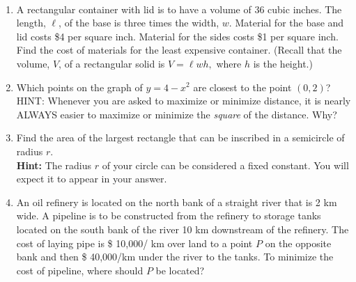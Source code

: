 \documentclass[11pt,fleqn]{article}
\begin{document}
\vspace*{-0.7in}

\begin{center}
  \Large{}\\
\end{center}
\begin{enumerate}
\item A rectangular container with lid is to have a volume of 36 cubic inches. The length, $\ell$, of the base is three times the width, $w.$ Material for the base and lid costs \$4 per square inch. Material for the sides costs \$1 per square inch. Find the cost of materials for the least expensive container. (Recall that the volume, $V$, of a rectangular solid is $V=\ell w h,$ where $h$ is the height.)
\vfill
\item Which points on the graph of $y = 4-x^2$ are
  closest to the point $(0, 2)$?\\
   HINT: Whenever you are asked to maximize or minimize distance, it is nearly ALWAYS easier to maximize or minimize the \emph{square} of the distance. Why?
\vfill
\newpage
\item Find the area of the largest rectangle that can
  be inscribed in a semicircle of radius $r$.\\ \textbf{Hint:} The radius $r$ of your circle can be considered a fixed constant. You will expect it to appear in your answer. 
  \vfill
\item An oil refinery is located on the north bank of a
straight river that is 2 km wide. A pipeline is to be constructed from
the refinery to storage tanks located on the south bank of the river 10
km downstream of the refinery. The cost of laying pipe is \$ 10,000/
km over land to a point $P$ on the opposite bank and then \$ 40,000/km
under the river to the tanks. To minimize the cost of pipeline, where
should $P$ be located? 
\vfill

\end{enumerate}
\end{document}
